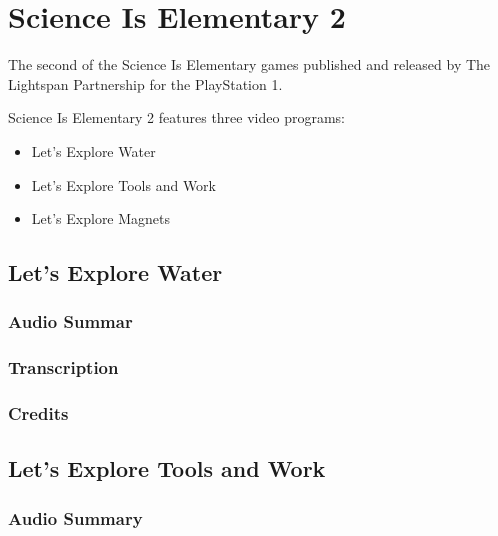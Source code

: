 \chapter{Science Is Elementary 2}


The second of the Science Is Elementary games published and released by The Lightspan Partnership for the PlayStation 1.

Science Is Elementary 2 features three video programs:

\begin{itemize}
    \item Let's Explore Water
    \item Let's Explore Tools and Work
    \item Let's Explore Magnets
\end{itemize}

\clearpage
\newpage

\section{Let's Explore Water}

\subsection{Audio Summar}

\subsection{Transcription}

\subsection{Credits}

\section{Let's Explore Tools and Work}

\subsection{Audio Summary}

